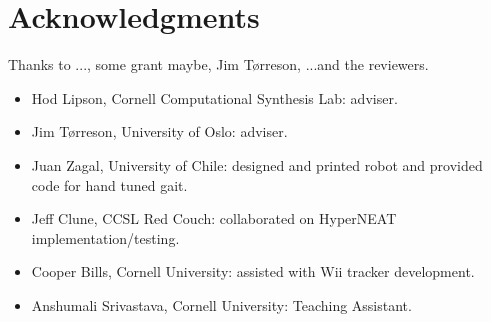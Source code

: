 \section{Acknowledgments}

Thanks to ..., some grant maybe, Jim T\o rreson, ...and the reviewers.


\begin{itemize}
\item Hod Lipson, Cornell Computational Synthesis Lab: adviser.
\item Jim T\o rreson, University of Oslo: adviser.
\item Juan Zagal, University of Chile: designed and printed robot and provided code for hand tuned gait.
\item Jeff Clune, CCSL Red Couch: collaborated on HyperNEAT implementation/testing.
\item Cooper Bills, Cornell University: assisted with Wii tracker development.
\item Anshumali Srivastava, Cornell University: Teaching Assistant.
\end{itemize}

